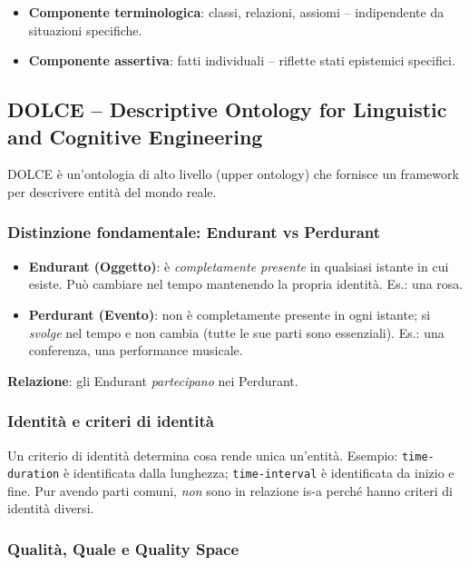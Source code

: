 \documentclass[12pt,a4paper]{article}
\begin{document}
\begin{itemize}[leftmargin=1.5em]
  \item \textbf{Componente terminologica}: classi, relazioni, assiomi -- indipendente da situazioni specifiche.
  \item \textbf{Componente assertiva}: fatti individuali -- riflette stati epistemici specifici.
\end{itemize}

\subsection{DOLCE -- Descriptive Ontology for Linguistic and Cognitive Engineering}

DOLCE è un'ontologia di alto livello (upper ontology) che fornisce un framework per descrivere entità del mondo reale.

\subsubsection{Distinzione fondamentale: Endurant vs Perdurant}

\begin{defbox}
\begin{itemize}[leftmargin=1.5em]
  \item \textbf{Endurant (Oggetto)}: è \emph{completamente presente} in qualsiasi istante in cui esiste. Può cambiare nel tempo mantenendo la propria identità. Es.: una rosa.
  \item \textbf{Perdurant (Evento)}: non è completamente presente in ogni istante; si \emph{svolge} nel tempo e non cambia (tutte le sue parti sono essenziali). Es.: una conferenza, una performance musicale.
\end{itemize}
\end{defbox}

\textbf{Relazione}: gli Endurant \emph{partecipano} nei Perdurant.

\subsubsection{Identità e criteri di identità}

Un criterio di identità determina cosa rende unica un'entità. Esempio: \texttt{time-duration} è identificata dalla lunghezza; \texttt{time-interval} è identificata da inizio e fine. Pur avendo parti comuni, \emph{non} sono in relazione is-a perché hanno criteri di identità diversi.

\subsubsection{Qualità, Quale e Quality Space}
\end{document}
